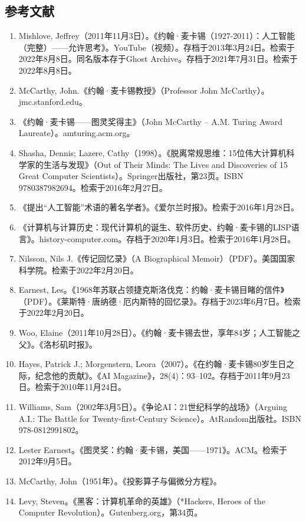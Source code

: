 \subsection{参考文献}
\begin{enumerate}
\item Mishlove, Jeffrey（2011年11月3日）。《约翰·麦卡锡（1927-2011）：人工智能（完整）——允许思考》。YouTube（视频）。存档于2013年3月24日。检索于2022年8月8日。同名版本存于Ghost Archive。存档于2021年7月31日。检索于2022年8月8日。
\item McCarthy, John.《约翰·麦卡锡教授》（Professor John McCarthy）。jmc.stanford.edu。
\item 《约翰·麦卡锡——图灵奖得主》（John McCarthy – A.M. Turing Award Laureate）。amturing.acm.org。
\item Shasha, Dennis; Lazere, Cathy（1998）。《脱离常规思维：15位伟大计算机科学家的生活与发现》（Out of Their Minds: The Lives and Discoveries of 15 Great Computer Scientists）。Springer出版社，第23页。ISBN 9780387982694。检索于2016年2月27日。
\item 《提出“人工智能”术语的著名学者》。《爱尔兰时报》。检索于2016年1月28日。
\item 《计算机与计算历史：现代计算机的诞生、软件历史、约翰·麦卡锡的LISP语言》。history-computer.com。存档于2020年1月3日。检索于2016年1月28日。
\item Nilsson, Nils J.《传记回忆录》（A Biographical Memoir）（PDF）。美国国家科学院。检索于2022年2月20日。
\item Earnest, Les。《1968年苏联占领捷克斯洛伐克：约翰·麦卡锡目睹的信件》（PDF）。《莱斯特·唐纳德·厄内斯特的回忆录》。存档于2023年6月7日。检索于2022年2月20日。
\item Woo, Elaine（2011年10月28日）。《约翰·麦卡锡去世，享年84岁；人工智能之父》。《洛杉矶时报》。
\item Hayes, Patrick J.; Morgenstern, Leora（2007）。《在约翰·麦卡锡80岁生日之际，纪念他的贡献》。《AI Magazine》，28(4)：93–102。存档于2011年9月23日。检索于2010年11月24日。
\item Williams, Sam（2002年3月5日）。《争论AI：21世纪科学的战场》（Arguing A.I.: The Battle for Twenty-first-Century Science）。AtRandom出版社。ISBN 978-0812991802。
\item Lester Earnest。《图灵奖：约翰·麦卡锡，美国——1971》。ACM。检索于2012年9月5日。
\item McCarthy, John（1951年）。《投影算子与偏微分方程》。
\item Levy, Steven。《黑客：计算机革命的英雄》（*Hackers, Heroes of the Computer Revolution）。Gutenberg.org，第34页。

\end{enumerate}
